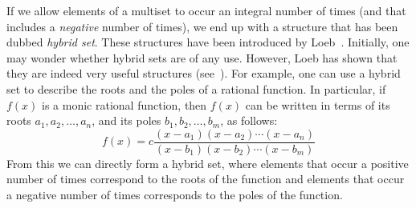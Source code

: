 \documentclass{amsart}
\theoremstyle{definition}
\begin{document}
If we allow elements of a multiset to occur an integral number of times (and 
that includes a {\em negative} number of times), we end up with a structure that
has been dubbed {\em hybrid set}. These structures have been introduced by 
Loeb~\cite{loeb92}. Initially, one may wonder whether hybrid sets are of any 
use. However, Loeb has shown that they are indeed very useful structures 
(see~\cite{loeb92,loeb95}). For example, one can use a hybrid set to describe 
the roots and the poles of a rational function. In particular, if $f(x)$ is a 
monic rational function, then $f(x)$ can be written  in terms of its roots 
$a_1,a_2,\ldots,a_n$, and its poles $b_1,b_2,\ldots,b_m$, as follows:
\begin{displaymath}
f(x)=c\frac{(x-a_1)(x-a_2)\cdots(x-a_n)}{(x-b_1)(x-b_2)\cdots(x-b_m)}
\end{displaymath}
From this we can directly form a hybrid set, where elements that occur a 
positive number of times correspond to the roots of the function and
elements that occur a negative number of times corresponds to the poles of 
the function.
\end{document}
